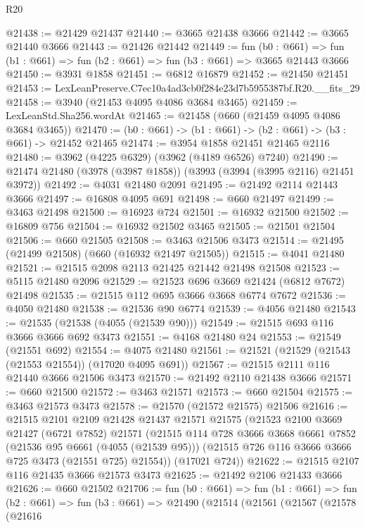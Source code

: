 \begin{lexlean}{R20}
\begin{coremodule}
@21438 := @21429 @21437
@21440 := @3665 @21438 @3666
@21442 := @3665 @21440 @3666
@21443 := @21426 @21442
@21449 := fun (b0 : @661) =>
  fun (b1 : @661) => fun (b2 : @661) => fun (b3 : @661) => @3665 @21443 @3666
@21450 := @3931 @1858
@21451 := @6812 @16879
@21452 := @21450 @21451
@21453 := LexLeanPreserve.C7ec10a4ad3cb0f284e23d7b5955387bf.R20.__fits_29
@21458 := @3940 (@21453 @4095 @4086 @3684 @3465)
@21459 := LexLeanStd.Sha256.wordAt
@21465 := @21458 (@660 (@21459 @4095 @4086 @3684 @3465))
@21470 := (b0 : @661) -> (b1 : @661) -> (b2 : @661) -> (b3 : @661) -> @21452 @21465
@21474 := @3954 @1858 @21451 @21465 @2116
@21480 := @3962 (@4225 @6329) (@3962 (@4189 @6526) @7240)
@21490 := @21474 @21480 (@3978 (@3987 @1858)) (@3993 (@3994 (@3995 @2116) @21451 @3972))
@21492 := @4031 @21480 @2091
@21495 := @21492 @2114 @21443 @3666
@21497 := @16808 @4095 @691
@21498 := @660 @21497
@21499 := @3463 @21498
@21500 := @16923 @724
@21501 := @16932 @21500
@21502 := @16809 @756
@21504 := @16932 @21502 @3465
@21505 := @21501 @21504
@21506 := @660 @21505
@21508 := @3463 @21506 @3473
@21514 := @21495 (@21499 @21508) (@660 (@16932 @21497 @21505))
@21515 := @4041 @21480
@21521 := @21515 @2098 @2113 @21425 @21442 @21498 @21508
@21523 := @5115 @21480 @2096
@21529 := @21523 @696 @3669 @21424 (@6812 @7672) @21498
@21535 := @21515 @112 @695 @3666 @3668 @6774 @7672
@21536 := @4050 @21480
@21538 := @21536 @90 @6774
@21539 := @4056 @21480
@21543 := @21535 (@21538 (@4055 (@21539 @90)))
@21549 := @21515 @693 @116 @3666 @3666 @692 @3473
@21551 := @4168 @21480 @24
@21553 := @21549 (@21551 @692)
@21554 := @4075 @21480
@21561 := @21521 (@21529 (@21543 (@21553 @21554)) (@17020 @4095 @691))
@21567 := @21515 @2111 @116 @21440 @3666 @21506 @3473
@21570 := @21492 @2110 @21438 @3666
@21571 := @660 @21500
@21572 := @3463 @21571
@21573 := @660 @21504
@21575 := @3463 @21573 @3473
@21578 := @21570 (@21572 @21575) @21506
@21616 := @21515
    @2101
    @2109
    @21428
    @21437
    @21571
    @21575
    (@21523
      @2100
      @3669
      @21427
      (@6721 @7852)
      @21571
      (@21515
        @114
        @728
        @3666
        @3668
        @6661
        @7852
        (@21536 @95 @6661 (@4055 (@21539 @95)))
        (@21515 @726 @116 @3666 @3666 @725 @3473 (@21551 @725) @21554))
      (@17021 @724))
@21622 := @21515 @2107 @116 @21435 @3666 @21573 @3473
@21625 := @21492 @2106 @21433 @3666
@21626 := @660 @21502
@21706 := fun (b0 : @661) =>
  fun (b1 : @661) =>
  fun (b2 : @661) =>
  fun (b3 : @661) =>
  @21490
    (@21514
      (@21561
        (@21567
          (@21578
            (@21616

\end{coremodule}
\end{lexlean}
